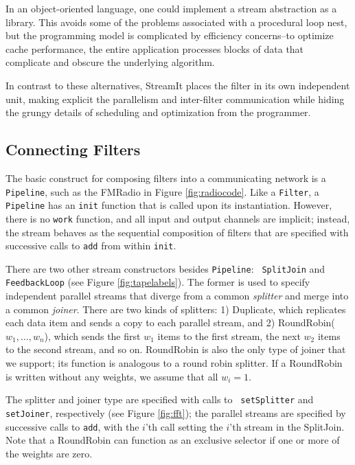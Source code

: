 In an object-oriented language, one could implement a stream
abstraction as a library.  This avoids some of the problems associated
with a procedural loop nest, but the programming model is complicated
by efficiency concerns--to optimize cache performance, the entire
application processes blocks of data that complicate and obscure the
underlying algorithm.

In contrast to these alternatives, StreamIt places the filter in its
own independent unit, making explicit the parallelism and inter-filter
communication while hiding the grungy details of scheduling and
optimization from the programmer.

\subsection{Connecting Filters}
\label{sec:connecting}

The basic construct for composing filters into a communicating network
is a {\tt Pipeline}, such as the FMRadio in Figure
\ref{fig:radiocode}.  Like a {\tt Filter}, a {\tt Pipeline} has an
{\tt init} function that is called upon its instantiation.  However,
there is no {\tt work} function, and all input and output channels are
implicit; instead, the stream behaves as the sequential composition of
filters that are specified with successive calls to {\tt add} from
within {\tt init}.

There are two other stream constructors besides {\tt Pipeline}: {\tt
SplitJoin} and {\tt FeedbackLoop} (see Figure \ref{fig:tapelabels}).
The former is used to specify independent parallel streams that
diverge from a common {\it splitter} and merge into a common {\it
joiner}.  There are two kinds of splitters: 1) Duplicate, which
replicates each data item and sends a copy to each parallel stream,
and 2) RoundRobin($w_1, \dots, w_n$), which sends the first $w_1$
items to the first stream, the next $w_2$ items to the second stream,
and so on.  RoundRobin is also the only type of joiner that we
support; its function is analogous to a round robin splitter.  If a
RoundRobin is written without any weights, we assume that all $w_i =
1$.

The splitter and joiner type are specified with calls to {\tt
setSplitter} and {\tt setJoiner}, respectively (see Figure
\ref{fig:fft}); the parallel streams are specified by successive calls
to {\tt add}, with the $i$'th call setting the $i$'th stream in the
SplitJoin.  Note that a RoundRobin can function as an exclusive
selector if one or more of the weights are zero.

